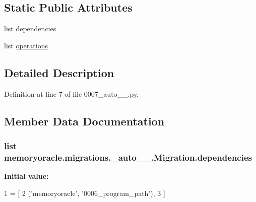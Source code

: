 \subsection*{Static Public Attributes}
\begin{DoxyCompactItemize}
\item 
list \hyperlink{classmemoryoracle_1_1migrations_1_10007__auto__20150403__0248_1_1Migration_a27b62c6be170af16eb01128254ad3a1a}{dependencies}
\item 
list \hyperlink{classmemoryoracle_1_1migrations_1_10007__auto__20150403__0248_1_1Migration_aceea320cde2ae6cf73a1260b67c51c1e}{operations}
\end{DoxyCompactItemize}


\subsection{Detailed Description}


Definition at line 7 of file 0007\+\_\+auto\+\_\+\_.\+py.



\subsection{Member Data Documentation}
\hypertarget{classmemoryoracle_1_1migrations_1_10007__auto__20150403__0248_1_1Migration_a27b62c6be170af16eb01128254ad3a1a}{}
\subsubsection[{dependencies}]{\setlength{\rightskip}{0pt plus 5cm}list memoryoracle.\+migrations.\+\_\+auto\+\_\+\_.\+Migration.\+dependencies\hspace{0.3cm}{\ttfamily [static]}}\label{classmemoryoracle_1_1migrations_1_10007__auto__20150403__0248_1_1Migration_a27b62c6be170af16eb01128254ad3a1a}
{\bfseries Initial value\+:}
\begin{DoxyCode}
1 = [
2         (\textcolor{stringliteral}{'memoryoracle'}, \textcolor{stringliteral}{'0006\_program\_path'}),
3     ]
\end{DoxyCode}


